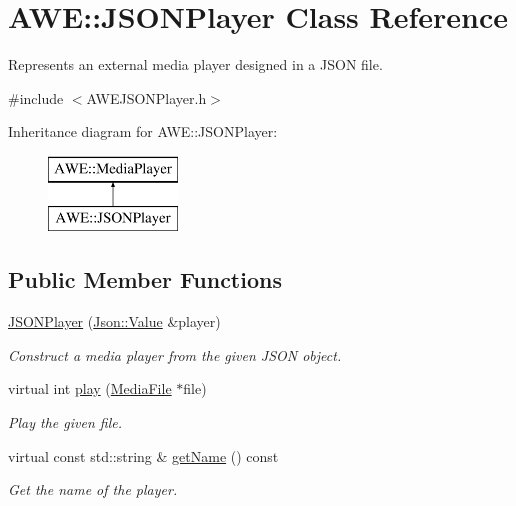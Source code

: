 \hypertarget{class_a_w_e_1_1_j_s_o_n_player}{\section{A\-W\-E\-:\-:J\-S\-O\-N\-Player Class Reference}
\label{class_a_w_e_1_1_j_s_o_n_player}
}


Represents an external media player designed in a J\-S\-O\-N file.  




{\ttfamily \#include $<$A\-W\-E\-J\-S\-O\-N\-Player.\-h$>$}

Inheritance diagram for A\-W\-E\-:\-:J\-S\-O\-N\-Player\-:\begin{figure}[H]
\begin{center}
\leavevmode
\includegraphics[height=2.000000cm]{class_a_w_e_1_1_j_s_o_n_player}
\end{center}
\end{figure}
\subsection*{Public Member Functions}
\begin{DoxyCompactItemize}
\item 
\hyperlink{class_a_w_e_1_1_j_s_o_n_player_a7aceda6a2e246528d952d4b50c0645e0}{J\-S\-O\-N\-Player} (\hyperlink{class_json_1_1_value}{Json\-::\-Value} \&player)
\begin{DoxyCompactList}\small\item\em Construct a media player from the given J\-S\-O\-N object. \end{DoxyCompactList}\item 
virtual int \hyperlink{class_a_w_e_1_1_j_s_o_n_player_a417957c7b0826ecef28b232a2cf9d49e}{play} (\hyperlink{class_a_w_e_1_1_media_file}{Media\-File} $\ast$file)
\begin{DoxyCompactList}\small\item\em Play the given file. \end{DoxyCompactList}\item 
virtual const std\-::string \& \hyperlink{class_a_w_e_1_1_j_s_o_n_player_a24bd164f654e3fda5587be04013bb366}{get\-Name} () const 
\begin{DoxyCompactList}\small\item\em Get the name of the player. \end{DoxyCompactList}\end{DoxyCompactItemize}


